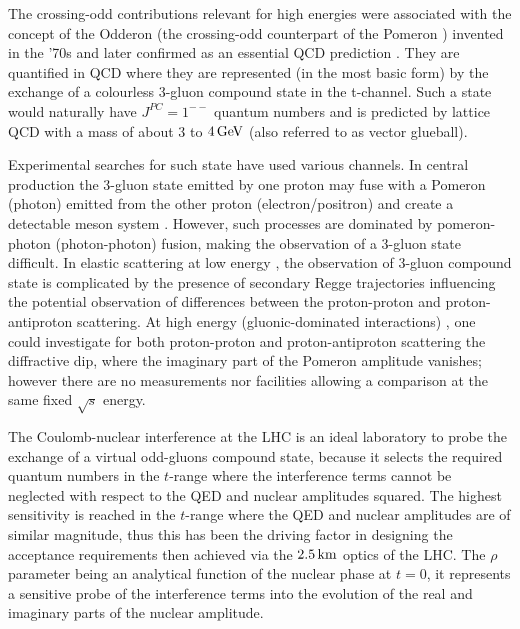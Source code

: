The crossing-odd contributions relevant for high energies were associated with the concept of the Odderon (the crossing-odd counterpart of the Pomeron \cite{levin-1998}) invented in the '70s \cite{nicolescu-1973,nicolescu-1975} and later confirmed as an essential QCD prediction \cite{bartels-1980,kwiecinski-1980,jaroszewicz-1981,braun,ioffe-2010}. They are quantified in QCD \cite{levin-1990,durham-2018} where they are represented (in the most basic form) by the exchange of a colourless 3-gluon compound state in the t-channel. Such a state would naturally have $J^{PC}=1^{--}$ quantum numbers and is predicted by lattice QCD with a mass of about $3$ to $4\,{\rm GeV}$ (also referred to as vector glueball).

Experimental searches for such state have used various channels. In central production the 3-gluon state emitted by one proton may fuse with a Pomeron (photon) emitted from the other proton (electron/positron) and create a detectable meson system \cite{hera-odderon-2002}. However, such processes are dominated by pomeron-photon (photon-photon) fusion, making the observation of a 3-gluon state difficult. In elastic scattering at low energy \cite{breakstone-85}, the observation of 3-gluon compound state is complicated by the presence of secondary Regge trajectories influencing the potential observation of differences between the proton-proton and proton-antiproton scattering. At high energy (gluonic-dominated interactions) \cite{yellow-report}, one could investigate for both proton-proton and proton-antiproton scattering the diffractive dip, where the imaginary part of the Pomeron amplitude vanishes; however there are no measurements nor facilities allowing a comparison at the same fixed $\sqrt s$ energy.

The Coulomb-nuclear interference at the LHC is an ideal laboratory to probe the exchange of a virtual odd-gluons compound state, because it selects the required quantum numbers in the $t$-range where the interference terms cannot be neglected with respect to the QED and nuclear amplitudes squared. The highest sensitivity is reached in the $t$-range where the QED and nuclear amplitudes are of similar magnitude, thus this has been the driving factor in designing the acceptance requirements then achieved via the $2.5\,{\rm km}$ optics of the LHC. The $\rho$ parameter being an analytical function of the nuclear phase at $t=0$, it represents a sensitive probe of the interference terms into the evolution of the real and imaginary parts of the nuclear amplitude.

